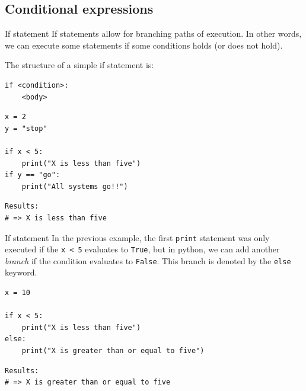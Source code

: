\documentclass[10pt]{beamer}
\begin{document}
\subsection{Conditional expressions}
\label{sec:orgd372618}

\begin{frame}[label={sec:orgcea01ba},fragile]{If statement}
 If statements allow for branching paths of execution. In other words, we can execute
some statements if some conditions holds (or does not hold).

The structure of a simple if statement is:

\begin{verbatim}
if <condition>:
    <body>
\end{verbatim}

\begin{verbatim}
x = 2
y = "stop"

if x < 5:
    print("X is less than five")
if y == "go":
    print("All systems go!!")
\end{verbatim}

\begin{verbatim}
Results: 
# => X is less than five
\end{verbatim}
\end{frame}

\begin{frame}[label={sec:org4de3b0a},fragile]{If statement}
 In the previous example, the first \texttt{print} statement was only executed if the \texttt{x < 5}
evaluates to \texttt{True}, but in python, we can add another \emph{branch} if the condition
evaluates to \texttt{False}. This branch is denoted by the \texttt{else} keyword.

\begin{verbatim}
x = 10

if x < 5:
    print("X is less than five")
else:
    print("X is greater than or equal to five")
\end{verbatim}

\begin{verbatim}
Results: 
# => X is greater than or equal to five
\end{verbatim}
\end{frame}
\end{document}
